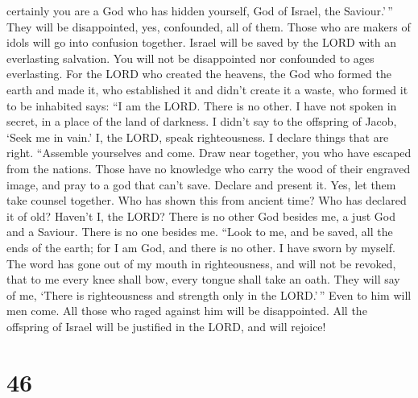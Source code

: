 certainly you are a God who has hidden yourself, God of Israel, the
Saviour.'\,''  They will be disappointed, yes,
confounded, all of them. Those who are makers of idols will go into
confusion together.  Israel will be saved by the LORD
with an everlasting salvation. You will not be disappointed nor
confounded to ages everlasting.  For the LORD who created
the heavens, the God who formed the earth and made it, who established
it and didn't create it a waste, who formed it to be inhabited says: ``I
am the LORD. There is no other.  I have not spoken in
secret, in a place of the land of darkness. I didn't say to the
offspring of Jacob, `Seek me in vain.' I, the LORD, speak righteousness.
I declare things that are right.  ``Assemble yourselves
and come. Draw near together, you who have escaped from the nations.
Those have no knowledge who carry the wood of their engraved image, and
pray to a god that can't save.  Declare and present it.
Yes, let them take counsel together. Who has shown this from ancient
time? Who has declared it of old? Haven't I, the LORD? There is no other
God besides me, a just God and a Saviour. There is no one besides me.
 ``Look to me, and be saved, all the ends of the earth;
for I am God, and there is no other.  I have sworn by
myself. The word has gone out of my mouth in righteousness, and will not
be revoked, that to me every knee shall bow, every tongue shall take an
oath.  They will say of me, `There is righteousness and
strength only in the LORD.'\,'' Even to him will men come. All those who
raged against him will be disappointed.  All the
offspring of Israel will be justified in the LORD, and will rejoice!

\hypertarget{section-45}{%
\section{46}\label{section-45}}

